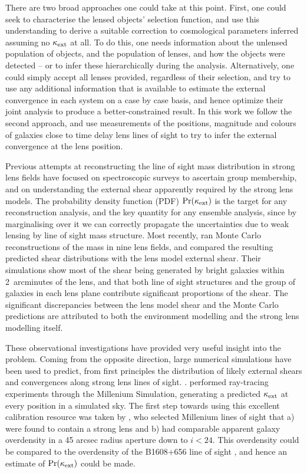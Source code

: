 \documentclass[useAMS,usenatbib]{mn2e}
\begin{document}
There are two broad approaches one could take at this point. First, one could
seek to characterise the lensed objects' selection function, and use this
understanding to derive a suitable correction to cosmological parameters
inferred assuming no $\kappa_{\rm ext}$ at all. To do this, one needs information about
the unlensed population of objects, and the population of lenses, and how the
objects were detected -- or to infer these hierarchically during the analysis.
Alternatively, one could simply accept all lenses provided, regardless of their
selection, and try to use any additional information that is available to
estimate the external convergence in each system on a case by case basis, and
hence optimize their joint analysis to produce a better-constrained result. In
this work we follow the second approach, and use measurements of the positions,
magnitude and colours of galaxies close to time delay lens lines of sight to try
to infer the external convergence at the lens position. 

Previous attempts at reconstructing the line of sight mass distribution in
strong lens fields have focused on spectroscopic surveys to ascertain group
membership, and on understanding the external shear apparently required by the
strong lens models.  The probability density function (PDF) $\Pr(\kappa_{\rm ext})$ is
the target for any reconstruction analysis, and the key quantity for any
ensemble analysis, since by marginalising over it we can correctly propagate
the uncertainties due to weak lensing by line of sight mass structure. 
Most recently, \citet{Wong++2011} ran Monte
Carlo reconstructions of the mass in nine lens fields, and compared the
resulting predicted shear distributions with the lens model external shear.
Their simulations show most of  the shear being generated by bright galaxies
within 2~arcminutes of the lens, and that both line of sight structures and
the group of galaxies in each lens plane contribute significant proportions of
the shear. The significant discrepancies between the lens model shear and the
Monte Carlo predictions are attributed to both the environment modelling and
the strong lens modelling itself.

These observational investigations have provided very useful insight into the
problem.  Coming from the opposite direction, large numerical simulations have
been used to predict, from first principles the distribution of likely
external shears and convergences along strong lens lines of sight. . \citet{Hilbert++2009}
performed ray-tracing experiments through the Millenium Simulation, generating
a predicted $\kappa_{\rm ext}$ at every position in a simulated sky. The first step
towards using this excellent calibration resource was taken by
\citet{Suyu++2010}, who selected Millenium lines of sight that a) were found
to contain a strong lens and b) had comparable apparent galaxy overdensity in
a 45 arcsec radius aperture down to $i < 24$. This overdensity could be
compared to the overdensity of the B1608$+$656 line of sight
\citep{Fass+Koop2010}, and hence an estimate of  $\Pr(\kappa_{\rm ext})$ could be
made. 
\end{document}
